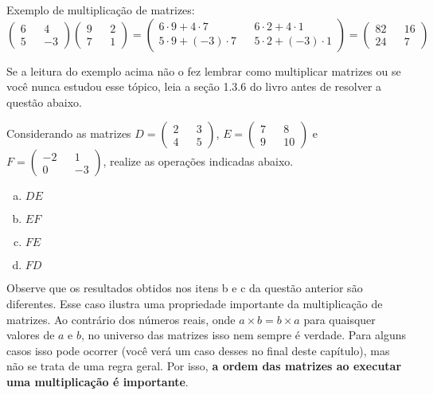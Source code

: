 \documentclass[main_estudante.tex]{subfiles}
\begin{document}
\begin{shaded*}
 \noindent  Exemplo de multiplicação de matrizes:
 $$ \begin{pmatrix} 6 && 4 \\ 5 && -3 \end{pmatrix} \begin{pmatrix} 9 && 2 \\ 7 && 1  \end{pmatrix} = \begin{pmatrix} 6 \cdot 9 + 4 \cdot 7 &&  6 \cdot2 + 4 \cdot 1 \\ 5 \cdot 9 + (-3) \cdot 7 && 5 \cdot 2 + (-3) \cdot 1 \end{pmatrix} = \begin{pmatrix} 82 &&  16 \\ 24 && 7 \end{pmatrix}$$
\end{shaded*}

Se a leitura do exemplo acima não o fez lembrar como multiplicar matrizes ou se você nunca estudou esse tópico, leia a seção 1.3.6 do livro  antes de resolver a questão abaixo.

\begin{questao}
Considerando as matrizes $D=\begin{pmatrix} 2 && 3 \\ 4 && 5 \end{pmatrix}$, $E=\begin{pmatrix} 7 && 8 \\ 9 && 10 \end{pmatrix}$ e $F=\begin{pmatrix} -2 && 1 \\ 0 && -3 \end{pmatrix}$, realize as operações indicadas abaixo.
\begin{enumerate}[a)]
\item $DE$
\item $EF$
\item $FE$
\item $FD$
\end{enumerate}
\end{questao}

Observe que os resultados obtidos nos itens b e c da questão anterior são diferentes. Esse caso ilustra uma propriedade importante da multiplicação de matrizes. Ao contrário dos números reais, onde $a \times b = b \times a$ para quaisquer valores de $a$ e $b$, no universo das matrizes isso nem sempre é verdade. Para alguns casos isso pode ocorrer (você verá um caso desses no final deste capítulo), mas não se trata de uma regra geral. Por isso, \textbf{a ordem das matrizes ao executar uma multiplicação é importante}.
\end{document}
